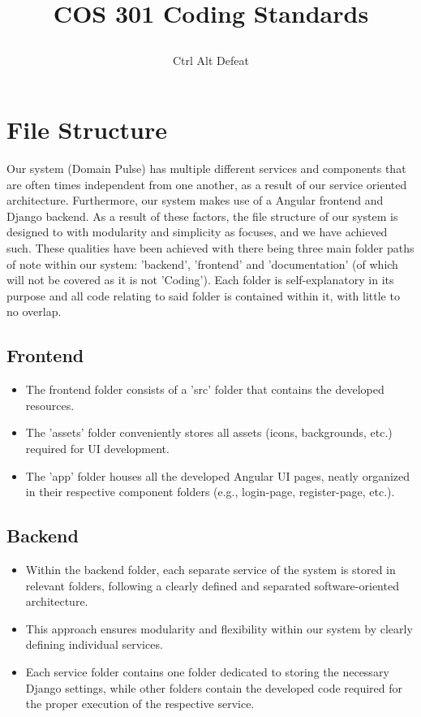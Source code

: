 \documentclass[12pt]{article}
\title{

\\
{COS 301 Coding Standards}
}
\author{Ctrl Alt Defeat}
\begin{document}


\tableofcontents

\newpage


\section{File Structure}
Our system (Domain Pulse) has multiple different services and components that are often times independent from one another, as a result of our service oriented architecture. Furthermore, our system makes use of a Angular frontend and Django backend. As a result of these factors, the file structure of our system is designed to with modularity and simplicity as focuses, and we have achieved such. These qualities have been achieved with there being three main folder paths of note within our system: 'backend', 'frontend' and 'documentation' (of which will not be covered as it is not 'Coding'). Each folder is self-explanatory in its purpose and all code relating to said folder is contained within it, with little to no overlap.

\subsection{Frontend}
\begin{itemize}
    \item The frontend folder consists of a 'src' folder that contains the developed resources.
    \item The 'assets' folder conveniently stores all assets (icons, backgrounds, etc.) required for UI development.
    \item The 'app' folder houses all the developed Angular UI pages, neatly organized in their respective component folders (e.g., login-page, register-page, etc.).
\end{itemize}
\subsection{Backend}
\begin{itemize}
    \item Within the backend folder, each separate service of the system is stored in relevant folders, following a clearly defined and separated software-oriented architecture.
    \item This approach ensures modularity and flexibility within our system by clearly defining individual services.
    \item Each service folder contains one folder dedicated to storing the necessary Django settings, while other folders contain the developed code required for the proper execution of the respective service.
\end{itemize}
\end{document}
